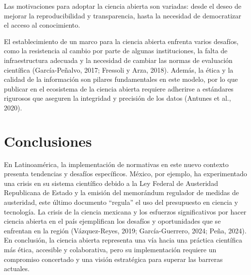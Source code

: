 \documentclass[
  latterpaper,
  DIV=11,
  numbers=noendperiod]{scrartcl}
\begin{document}
\begin{tcolorbox}[enhanced jigsaw, colframe=quarto-callout-tip-color-frame, toprule=.15mm, colbacktitle=quarto-callout-tip-color!10!white, coltitle=black, bottomtitle=1mm, opacityback=0, toptitle=1mm, rightrule=.15mm, arc=.35mm, title=\textcolor{quarto-callout-tip-color}{\faLightbulb}\hspace{0.5em}{Tip}, titlerule=0mm, breakable, colback=white, leftrule=.75mm, bottomrule=.15mm, left=2mm, opacitybacktitle=0.6]

Las motivaciones para adoptar la ciencia abierta son variadas: desde el
deseo de mejorar la reproducibilidad y transparencia, hasta la necesidad
de democratizar el acceso al conocimiento.

\end{tcolorbox}

\begin{tcolorbox}[enhanced jigsaw, colframe=quarto-callout-caution-color-frame, toprule=.15mm, colbacktitle=quarto-callout-caution-color!10!white, coltitle=black, bottomtitle=1mm, opacityback=0, toptitle=1mm, rightrule=.15mm, arc=.35mm, title=\textcolor{quarto-callout-caution-color}{\faFire}\hspace{0.5em}{Precaución}, titlerule=0mm, breakable, colback=white, leftrule=.75mm, bottomrule=.15mm, left=2mm, opacitybacktitle=0.6]

El establecimiento de un marco para la ciencia abierta enfrenta varios
desafíos, como la resistencia al cambio por parte de algunas
instituciones, la falta de infraestructura adecuada y la necesidad de
cambiar las normas de evaluación científica (García-Peñalvo, 2017;
Fressoli y Arza, 2018). Además, la ética y la calidad de la información
son pilares fundamentales en este modelo, por lo que publicar en el
ecosistema de la ciencia abierta requiere adherirse a estándares
rigurosos que aseguren la integridad y precisión de los datos (Antunes
et al., 2020).

\end{tcolorbox}

\section{Conclusiones}

En Latinoamérica, la implementación de normativas en este nuevo contexto
presenta tendencias y desafíos específicos. México, por ejemplo, ha
experimentado una crisis en su sistema científico debido a la Ley
Federal de Austeridad Republicana de Estado y la emisión del memorándum
regulador de medidas de austeridad, este último documento ``regula'' el
uso del presupuesto en ciencia y tecnología. La crisis de la ciencia
mexicana y los esfuerzos significativos por hacer ciencia abierta en el
país ejemplifican los desafíos y oportunidades que se enfrentan en la
región (Vázquez-Reyes, 2019; García-Guerrero, 2024; Peña, 2024). En
conclusión, la ciencia abierta representa una vía hacia una práctica
científica más ética, accesible y colaborativa, pero su implementación
requiere un compromiso concertado y una visión estratégica para superar
las barreras actuales.
\end{document}
